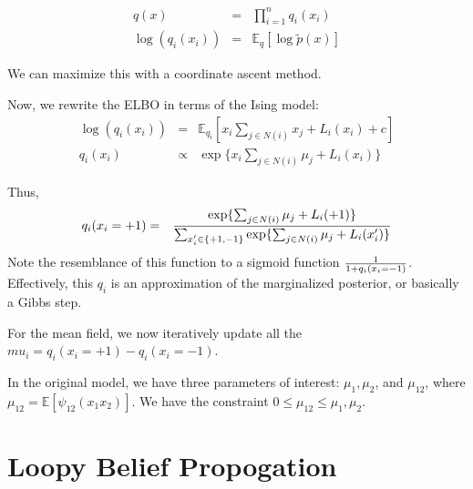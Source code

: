 \documentclass[twoside]{article}
\begin{document}
\begin{eqnarray*}
q(x) &=& \prod_{i=1}^n q_i (x_i) \\
\log ( q_i (x_i)) &=& \mathbb{E}_q [ \log \tilde{p}(x) ]
\end{eqnarray*}

We can maximize this with a coordinate ascent method. %

Now, we rewrite the ELBO in terms of the Ising model:
\begin{eqnarray*}
\log (q_i (x_i)) &=& \mathbb{E}_{q_i} [ x_i \sum_{j \in N(i)} x_j + L_i(x_i) +c ] \\
q_i (x_i) &\propto& \exp \{ x_i \sum_{j \in N(i)} \mu_j + L_i(x_i) \}
\end{eqnarray*}

Thus, 
\begin{eqnarray*}
q_i(x_i=+1) &=& { \exp\{ \sum_{j \in N(i)} \mu_j + L_i(+1) \}   \over \sum_{x_i^{\prime} \in \{ +1, -1\}} \exp \{ \sum_{j \in N(i)} \mu_j + L_i(x_i^{\prime}) \} }
\end{eqnarray*}
Note the resemblance of this function to a sigmoid function $1 \over 1+q_i(x_i=-1)$. Effectively, this $q_i$ is an approximation of the marginalized posterior, or basically a Gibbs step.

For the mean field, we now iteratively update all the $mu_i = q_i(x_i=+1) - q_i(x_i=-1)$. 

In the original model, we have three parameters of interest: $\mu_1, \mu_2$, and $\mu_{12}$, where $\mu_{12}=\mathbb{E}[\psi_{12}(x_1 x_2)]$. We have the constraint $0 \leq \mu_{12} \leq \mu_1, \mu_2$. 

\section{Loopy Belief Propogation}
\end{document}
